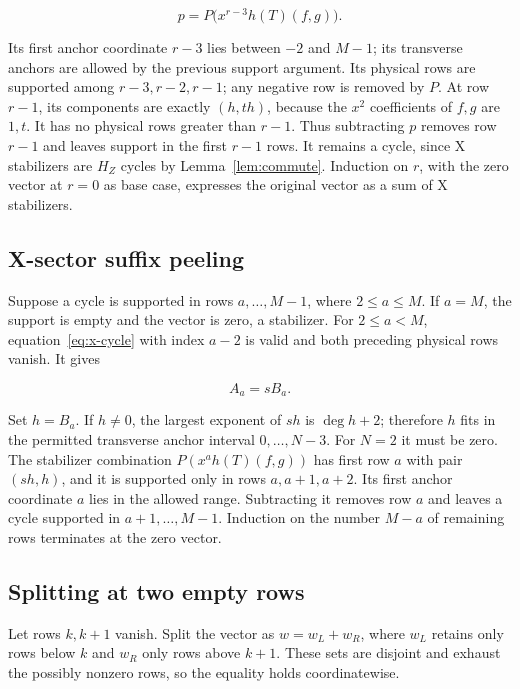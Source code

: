 \documentclass{article}
\begin{document}
\begin{equation}
 p=P\bigl(x^{r-3}h(T)(f,g)\bigr).
\end{equation}

Its first anchor coordinate \(r-3\) lies between \(-2\) and \(M-1\); its
transverse anchors are allowed by the previous support argument. Its
physical rows are supported among \(r-3,r-2,r-1\); any negative row is
removed by \(P\). At row \(r-1\), its components are exactly \((h,th)\),
because the \(x^2\) coefficients of \(f,g\) are \(1,t\). It has no
physical rows greater than \(r-1\). Thus subtracting \(p\) removes row
\(r-1\) and leaves support in the first \(r-1\) rows. It remains a
cycle, since X stabilizers are \(H_Z\) cycles by Lemma~\ref{lem:commute}. Induction
on \(r\), with the zero vector at \(r=0\) as base case, expresses the
original vector as a sum of X stabilizers.

\subsection{X-sector suffix peeling}\label{x-sector-suffix-peeling}

Suppose a cycle is supported in rows \(a,\ldots,M-1\), where \(2\le a\le M\).
If \(a=M\), the support is empty and the vector is zero, a stabilizer.
For \(2\le a<M\), equation~\eqref{eq:x-cycle} with index \(a-2\) is valid and both preceding
physical rows vanish. It gives

\begin{equation}
 A_a=sB_a.
\end{equation}

Set \(h=B_a\). If \(h\ne0\), the largest exponent of \(sh\) is
\(\deg h+2\); therefore \(h\) fits in the permitted transverse anchor
interval \(0,\ldots,N-3\). For \(N=2\) it must be zero. The stabilizer
combination \(P(x^ah(T)(f,g))\) has first row \(a\) with pair
\((sh,h)\), and it is supported only in rows \(a,a+1,a+2\). Its first
anchor coordinate \(a\) lies in the allowed range. Subtracting it
removes row \(a\) and leaves a cycle supported in \(a+1,\ldots,M-1\).
Induction on the number \(M-a\) of remaining rows terminates at the zero
vector.

\subsection{Splitting at two empty
rows}\label{splitting-at-two-empty-rows}

Let rows \(k,k+1\) vanish. Split the vector as \(w=w_L+w_R\), where
\(w_L\) retains only rows below \(k\) and \(w_R\) only rows above
\(k+1\). These sets are disjoint and exhaust the possibly nonzero rows,
so the equality holds coordinatewise.
\end{document}
